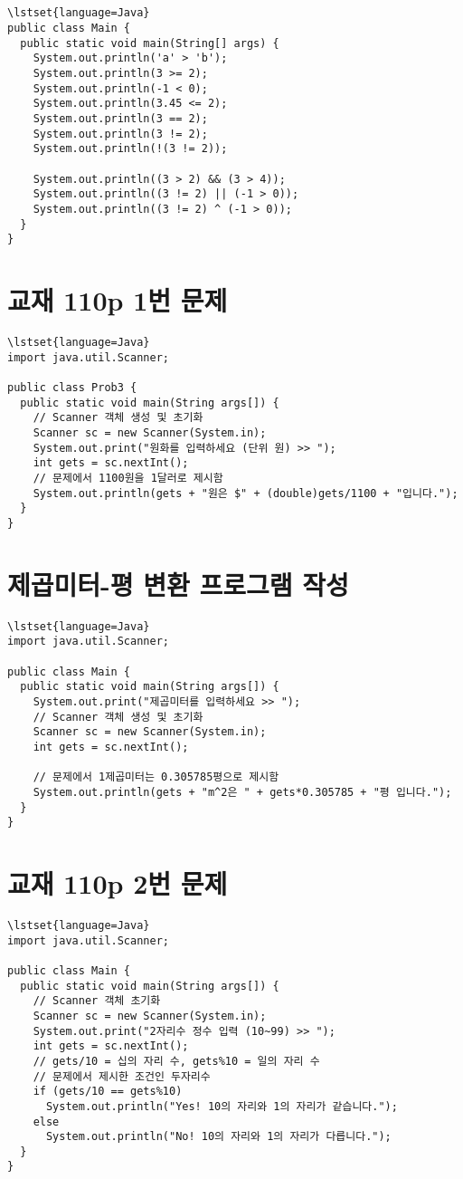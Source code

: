 \documentclass{article}
\begin{document}
\subsection{}
\begin{lstlisting}
\lstset{language=Java}
public class Main {
  public static void main(String[] args) {
    System.out.println('a' > 'b');
    System.out.println(3 >= 2);
    System.out.println(-1 < 0);
    System.out.println(3.45 <= 2);
    System.out.println(3 == 2);
    System.out.println(3 != 2);
    System.out.println(!(3 != 2));

    System.out.println((3 > 2) && (3 > 4));
    System.out.println((3 != 2) || (-1 > 0));
    System.out.println((3 != 2) ^ (-1 > 0));
  }
}
\end{lstlisting}
\section{교재 110p 1번 문제}
\begin{lstlisting}
\lstset{language=Java}
import java.util.Scanner;

public class Prob3 {
  public static void main(String args[]) {
    // Scanner 객체 생성 및 초기화
    Scanner sc = new Scanner(System.in);
    System.out.print("원화를 입력하세요 (단위 원) >> ");
    int gets = sc.nextInt();
    // 문제에서 1100원을 1달러로 제시함
    System.out.println(gets + "원은 $" + (double)gets/1100 + "입니다.");
  }
}
\end{lstlisting}
\section{제곱미터-평 변환 프로그램 작성}
\begin{lstlisting}
\lstset{language=Java}
import java.util.Scanner;

public class Main {
  public static void main(String args[]) {
    System.out.print("제곱미터를 입력하세요 >> ");
    // Scanner 객체 생성 및 초기화
    Scanner sc = new Scanner(System.in);
    int gets = sc.nextInt();

    // 문제에서 1제곱미터는 0.305785평으로 제시함
    System.out.println(gets + "m^2은 " + gets*0.305785 + "평 입니다.");
  }
}
\end{lstlisting}
\section{교재 110p 2번 문제}
\begin{lstlisting}
\lstset{language=Java}
import java.util.Scanner;

public class Main {
  public static void main(String args[]) {
    // Scanner 객체 초기화
    Scanner sc = new Scanner(System.in);
    System.out.print("2자리수 정수 입력 (10~99) >> ");
    int gets = sc.nextInt();
    // gets/10 = 십의 자리 수, gets%10 = 일의 자리 수
    // 문제에서 제시한 조건인 두자리수 
    if (gets/10 == gets%10)
      System.out.println("Yes! 10의 자리와 1의 자리가 같습니다.");
    else
      System.out.println("No! 10의 자리와 1의 자리가 다릅니다.");
  }
}
\end{lstlisting}
\end{document}
